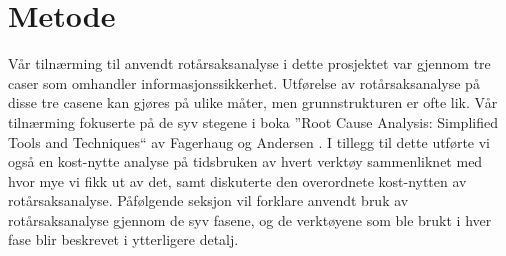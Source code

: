 \chapter{Metode}
\label{kap:metode}
Vår tilnærming til anvendt rotårsaksanalyse i dette prosjektet var gjennom tre caser som omhandler informasjonssikkerhet. Utførelse av rotårsaksanalyse på disse tre casene kan gjøres på ulike måter, men grunnstrukturen er ofte lik. Vår tilnærming fokuserte på de syv stegene i boka ''Root Cause Analysis: Simplified Tools and Techniques`` av Fagerhaug og Andersen \cite{RCA}. I tillegg til dette utførte vi også en kost-nytte analyse på tidsbruken av hvert verktøy sammenliknet med hvor mye vi fikk ut av det, samt diskuterte den overordnete kost-nytten av rotårsaksanalyse. Påfølgende seksjon vil forklare anvendt bruk av rotårsaksanalyse gjennom de syv fasene, og de verktøyene som ble brukt i hver fase blir beskrevet i ytterligere detalj. 